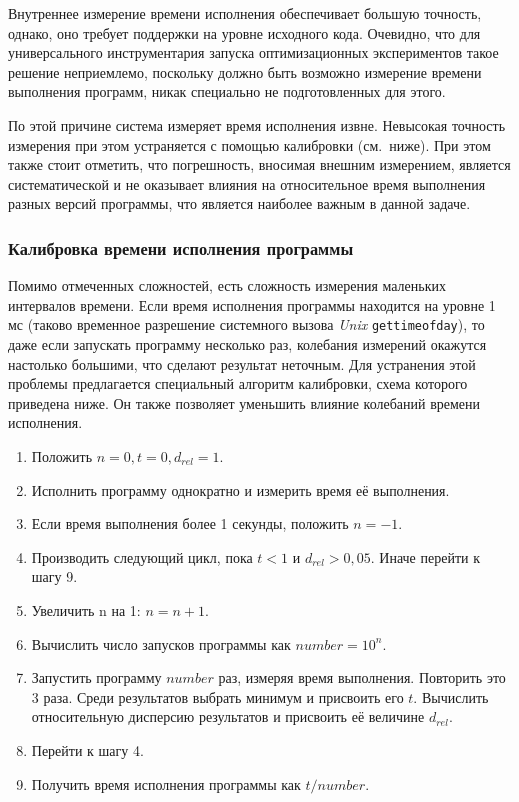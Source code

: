 Внутреннее измерение времени исполнения обеспечивает большую точность, однако, оно требует поддержки на уровне исходного кода. Очевидно, что для универсального инструментария запуска оптимизационных экспериментов такое решение неприемлемо, поскольку должно быть возможно измерение времени выполнения программ, никак специально не подготовленных для этого.

По этой причине система измеряет время исполнения извне. Невысокая точность измерения при этом устраняется с помощью калибровки (см.~ниже). При этом также стоит отметить, что погрешность, вносимая внешним измерением, является систематической и не оказывает влияния на относительное время выполнения разных версий программы, что является наиболее важным в данной задаче.


\subsubsection{Калибровка времени исполнения программы}
\label{sssect:calibration}
Помимо отмеченных сложностей, есть сложность измерения маленьких интервалов времени. Если время исполнения программы находится на уровне 1 мс (таково временное разрешение системного вызова \textit{Unix} \texttt{gettimeofday}), то даже если запускать программу несколько раз, колебания измерений окажутся настолько большими, что сделают результат неточным. Для устранения этой проблемы предлагается специальный алгоритм калибровки, схема которого приведена ниже. Он также позволяет уменьшить влияние колебаний времени исполнения.

\begin{enumerate}
    \item Положить $n = 0, t = 0, d_{rel} = 1$.
    \item Исполнить программу однократно и измерить время её выполнения.
    \item Если время выполнения более 1 секунды, положить $n = -1$.
    \item Производить следующий цикл, пока $t < 1$ и $d_{rel} > 0,05$. Иначе перейти к шагу 9.
    \item Увеличить n на 1: $n = n + 1$.
    \item Вычислить число запусков программы как $number = 10^{n}$.
    \item Запустить программу $number$ раз, измеряя время выполнения. Повторить это 3 раза. Среди результатов выбрать минимум и присвоить его $t$. Вычислить относительную дисперсию результатов и присвоить её величине $d_{rel}$.
    \item Перейти к шагу 4.
    \item Получить время исполнения программы как $t / number$.
\end{enumerate}

